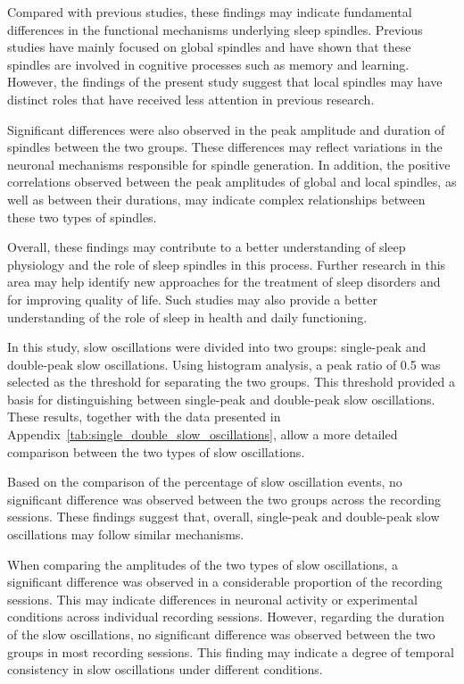 \documentclass[12pt]{report}
\begin{document}
Compared with previous studies, these findings may indicate fundamental differences in the functional mechanisms underlying sleep spindles. Previous studies have mainly focused on global spindles and have shown that these spindles are involved in cognitive processes such as memory and learning. However, the findings of the present study suggest that local spindles may have distinct roles that have received less attention in previous research.

Significant differences were also observed in the peak amplitude and duration of spindles between the two groups. These differences may reflect variations in the neuronal mechanisms responsible for spindle generation. In addition, the positive correlations observed between the peak amplitudes of global and local spindles, as well as between their durations, may indicate complex relationships between these two types of spindles.

Overall, these findings may contribute to a better understanding of sleep physiology and the role of sleep spindles in this process. Further research in this area may help identify new approaches for the treatment of sleep disorders and for improving quality of life. Such studies may also provide a better understanding of the role of sleep in health and daily functioning.

In this study, slow oscillations were divided into two groups: single-peak and double-peak slow oscillations. Using histogram analysis, a peak ratio of 0.5 was selected as the threshold for separating the two groups. This threshold provided a basis for distinguishing between single-peak and double-peak slow oscillations. These results, together with the data presented in Appendix~\ref{tab:single_double_slow_oscillations}, allow a more detailed comparison between the two types of slow oscillations.

Based on the comparison of the percentage of slow oscillation events, no significant difference was observed between the two groups across the recording sessions. These findings suggest that, overall, single-peak and double-peak slow oscillations may follow similar mechanisms.

When comparing the amplitudes of the two types of slow oscillations, a significant difference was observed in a considerable proportion of the recording sessions. This may indicate differences in neuronal activity or experimental conditions across individual recording sessions. However, regarding the duration of the slow oscillations, no significant difference was observed between the two groups in most recording sessions. This finding may indicate a degree of temporal consistency in slow oscillations under different conditions.
\end{document}
